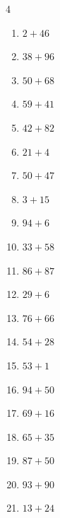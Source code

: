 \begin{multicols}{4}
\begin{enumerate}
  \item $2+46$
        \phantom{$=48$}

  \item $38+96$
        \phantom{$=134$}

  \item $50+68$
        \phantom{$=118$}

  \item $59+41$
        \phantom{$=100$}

  \item $42+82$
        \phantom{$=124$}

  \item $21+4$
        \phantom{$=25$}

  \item $50+47$
        \phantom{$=97$}

  \item $3+15$
        \phantom{$=18$}

  \item $94+6$
        \phantom{$=100$}

  \item $33+58$
        \phantom{$=91$}

  \item $86+87$
        \phantom{$=173$}

  \item $29+6$
        \phantom{$=35$}

  \item $76+66$
        \phantom{$=142$}

  \item $54+28$
        \phantom{$=82$}

  \item $53+1$
        \phantom{$=54$}

\columnbreak %

  \item $94+50$
        \phantom{$=144$}

  \item $69+16$
        \phantom{$=85$}

  \item $65+35$
        \phantom{$=100$}

  \item $87+50$
        \phantom{$=137$}

  \item $93+90$
        \phantom{$=183$}

  \item $13+24$
        \phantom{$=37$}


\end{enumerate}
\end{multicols}

